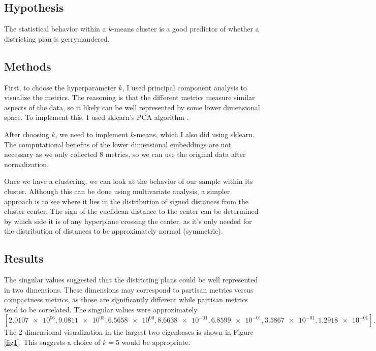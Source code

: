 \documentclass[a4paper]{article}
\theoremstyle{definition}
\begin{document}
	\subsection{Hypothesis}
	The statistical behavior within a $ k $-means cluster is a good predictor of whether a districting plan is gerrymandered.
	
	\subsection{Methods}
	First, to choose the hyperparameter $ k $, I used principal component analysis to visualize the metrics. The reasoning is that the different metrics measure similar aspects of the data, so it likely can be well represented by some lower dimensional space. To implement this, I used sklearn's PCA algorithm \cite{scikit-learn}.
	
	After choosing $ k $, we need to implement $ k $-means, which I also did using sklearn. The computational benefits of the lower dimensional embeddings are not necessary as we only collected $ 8 $ metrics, so we can use the original data after normalization.
	
	Once we have a clustering, we can look at the behavior of our sample within its cluster. Although this can be done using multivariate analysis, a simpler approach is to see where it lies in the distribution of signed distances from the cluster center. The sign of the euclidean distance to the center can be determined by which side it is of any hyperplane crossing the center, as it's only needed for the distribution of distances to be approximately normal (symmetric).
	
	\subsection{Results}
	The singular values suggested that the districting plans could be well represented in two dimensions. These dimensions may correspond to partisan metrics versus compactness metrics, as those are significantly different while partisan metrics tend to be correlated. The singular values were approximately
	\[ [\num{2.0107e+06}, \num{9.0811e+05}, \num{6.5658e+00}, \num{8.6638e-01}, \num{6.8599e-01}, \num{3.5867e-01}, \num{1.2918e-01} ]. \]
	The 2-dimensional visualization in the largest two eigenbases is shown in Figure \ref{fig1}. This suggests a choice of $ k=5 $ would be appropriate.
	
\end{document}
